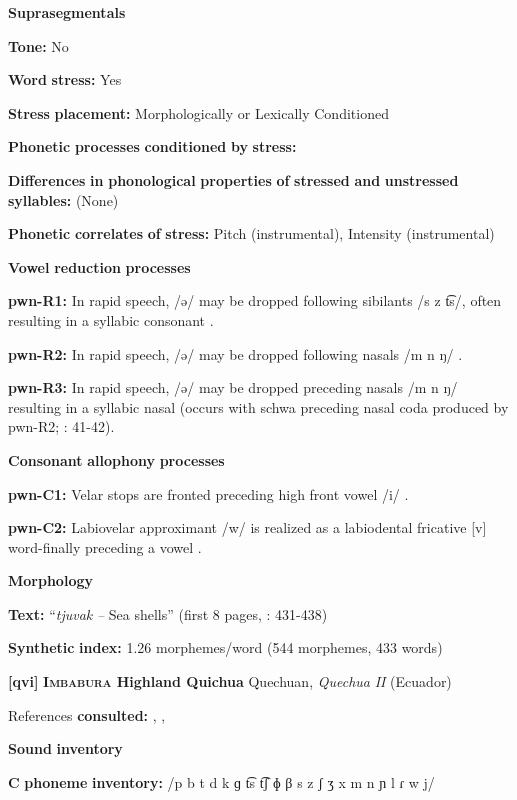 \textbf{Suprasegmentals}

\textbf{Tone:} No

\textbf{Word} \textbf{stress:} Yes

\textbf{Stress} \textbf{placement:} Morphologically or Lexically Conditioned

\textbf{Phonetic} \textbf{processes} \textbf{conditioned} \textbf{by} \textbf{stress:}

\textbf{Differences} \textbf{in} \textbf{phonological} \textbf{properties} \textbf{of} \textbf{stressed} \textbf{and} \textbf{unstressed} \textbf{syllables:} (None)

\textbf{Phonetic} \textbf{correlates} \textbf{of} \textbf{stress:} Pitch (instrumental), Intensity (instrumental)

\textbf{Vowel} \textbf{reduction} \textbf{processes}

\textbf{pwn-R1:} In rapid speech, /ə/ may be dropped following sibilants /s z t͡s/, often resulting in a syllabic consonant \citep[40-41]{Chang2006}.

\textbf{pwn-R2:} In rapid speech, /ə/ may be dropped following nasals /m n ŋ/ \citep[41]{Chang2006}.

\textbf{pwn-R3:} In rapid speech, /ə/ may be dropped preceding nasals /m n ŋ/ resulting in a syllabic nasal (occurs with schwa preceding nasal coda produced by pwn-R2; \citealt{Chang2006}: 41-42).

\textbf{Consonant} \textbf{allophony} \textbf{processes}

\textbf{pwn-C1:} Velar stops are fronted preceding high front vowel /i/ \citep[22]{Chang2006}.

\textbf{pwn-C2:} Labiovelar approximant /w/ is realized as a labiodental fricative [v] word-finally preceding a vowel \citep[40]{Chang2006}.

\textbf{Morphology}

\textbf{Text:} “\textit{tjuvak} \textit{--} Sea shells” (first 8 pages, \citealt{Chang2006}: 431-438)

\textbf{Synthetic} \textbf{index:} 1.26 morphemes/word (544 morphemes, 433 words)

\textbf{[qvi]}   \textbf{\textsc{Imbabura} \textbf{Highland} \textbf{Quichua}}    Quechuan, \textit{Quechua} \textit{II} (Ecuador)

References \textbf{consulted:} \citet{Carpenter1982}, \citet{Cole1982}, \citet{Jake1983}

\textbf{Sound} \textbf{inventory}

\textbf{C} \textbf{phoneme} \textbf{inventory:} /p b t d k ɡ t͡s t͡ʃ ɸ β s z ʃ ʒ x m n ɲ l ɾ w j/

